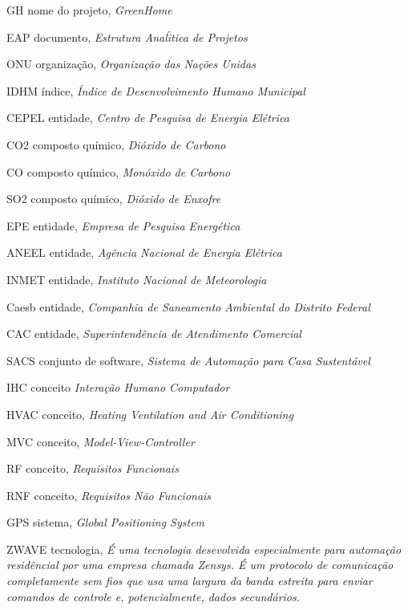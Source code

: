 \begin{simbolos}
  \item[GH] nome do projeto, \textit{GreenHome}
  \item[EAP] documento, \textit{Estrutura Ana\'litica de Projetos}
  \item[ONU] organização, \textit{Organização das Nações Unidas}
  \item[IDHM] índice, \textit{Índice de Desenvolvimento Humano Municipal}
  \item[CEPEL] entidade, \textit{Centro de Pesquisa de Energia Elétrica}
  \item[CO2] composto químico, \textit{Dióxido de Carbono}
  \item[CO] composto químico, \textit{Monóxido de Carbono}
  \item[SO2] composto químico, \textit{Dióxido de Enxofre}
  \item[EPE] entidade, \textit{Empresa de Pesquisa Energética}
  \item[ANEEL] entidade, \textit{Agência Nacional de Energia Elétrica}
  \item[INMET] entidade, \textit{Instituto Nacional de Meteorologia}
  \item[Caesb] entidade, \textit{Companhia de Saneamento Ambiental do Distrito Federal}
  \item[CAC] entidade, \textit{Superintendência de Atendimento Comercial}
  \item[SACS] conjunto de software, \textit{Sistema de Automação para Casa Sustentável}
  \item[IHC] conceito \textit{Interação Humano Computador}
  \item[HVAC] conceito, \textit{Heating Ventilation and Air Conditioning}
  \item[MVC] conceito, \textit{Model-View-Controller}
  \item[RF] conceito, \textit{Requisitos Funcionais}
  \item[RNF] conceito, \textit{Requisitos Não Funcionais}
  \item[GPS] sistema, \textit{Global Positioning System}
  \item[ZWAVE] tecnologia, \textit{É uma tecnologia desevolvida especialmente para automação residêncial por uma empresa chamada Zensys. É um protocolo de comunicação completamente sem fios que usa uma largura da banda estreita para enviar comandos de controle e, potencialmente, dados secundários.}
\end{simbolos}
